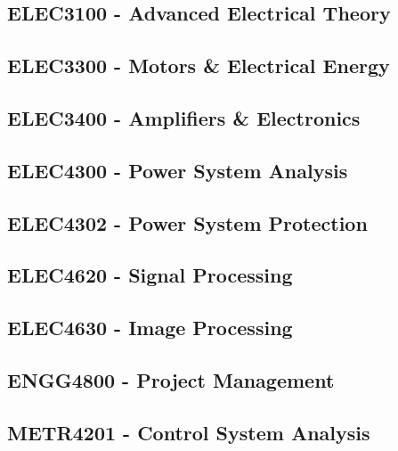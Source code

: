 \clearpage

\subsection{ELEC3100 - Advanced Electrical Theory}
\clearpage

\subsection{ELEC3300 - Motors \& Electrical Energy}
\clearpage

\subsection{ELEC3400 - Amplifiers \& Electronics}
\clearpage

\subsection{ELEC4300 - Power System Analysis}
\clearpage

\subsection{ELEC4302 - Power System Protection}
\clearpage

\subsection{ELEC4620 - Signal Processing}
\clearpage

\subsection{ELEC4630 - Image Processing}
\clearpage

\subsection{ENGG4800 - Project Management}
\clearpage

\subsection{METR4201 - Control System Analysis}
\clearpage





